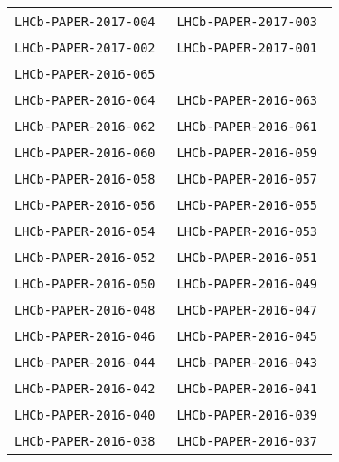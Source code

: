 \begin{center}
\begin{longtable}{ll}
\texttt{LHCb-PAPER-2017-004}~\cite{LHCb-PAPER-2017-004} &
\texttt{LHCb-PAPER-2017-003}~\cite{LHCb-PAPER-2017-003} \\
\texttt{LHCb-PAPER-2017-002}~\cite{LHCb-PAPER-2017-002} &
\texttt{LHCb-PAPER-2017-001}~\cite{LHCb-PAPER-2017-001} \\
\hline
\texttt{LHCb-PAPER-2016-065}~\cite{LHCb-PAPER-2016-065} & 
                                                        \\
\texttt{LHCb-PAPER-2016-064}~\cite{LHCb-PAPER-2016-064} & 
\texttt{LHCb-PAPER-2016-063}~\cite{LHCb-PAPER-2016-063} \\
\texttt{LHCb-PAPER-2016-062}~\cite{LHCb-PAPER-2016-062} & 
\texttt{LHCb-PAPER-2016-061}~\cite{LHCb-PAPER-2016-061} \\
\texttt{LHCb-PAPER-2016-060}~\cite{LHCb-PAPER-2016-060} & 
\texttt{LHCb-PAPER-2016-059}~\cite{LHCb-PAPER-2016-059} \\
\texttt{LHCb-PAPER-2016-058}~\cite{LHCb-PAPER-2016-058} & 
\texttt{LHCb-PAPER-2016-057}~\cite{LHCb-PAPER-2016-057} \\
\texttt{LHCb-PAPER-2016-056}~\cite{LHCb-PAPER-2016-056} & 
\texttt{LHCb-PAPER-2016-055}~\cite{LHCb-PAPER-2016-055} \\
\texttt{LHCb-PAPER-2016-054}~\cite{LHCb-PAPER-2016-054} & 
\texttt{LHCb-PAPER-2016-053}~\cite{LHCb-PAPER-2016-053} \\
\texttt{LHCb-PAPER-2016-052}~\cite{LHCb-PAPER-2016-052} & 
\texttt{LHCb-PAPER-2016-051}~\cite{LHCb-PAPER-2016-051} \\
\texttt{LHCb-PAPER-2016-050}~\cite{LHCb-PAPER-2016-050} & 
\texttt{LHCb-PAPER-2016-049}~\cite{LHCb-PAPER-2016-049} \\
\texttt{LHCb-PAPER-2016-048}~\cite{LHCb-PAPER-2016-048} & 
\texttt{LHCb-PAPER-2016-047}~\cite{LHCb-PAPER-2016-047} \\
\texttt{LHCb-PAPER-2016-046}~\cite{LHCb-PAPER-2016-046} & 
\texttt{LHCb-PAPER-2016-045}~\cite{LHCb-PAPER-2016-045} \\
\texttt{LHCb-PAPER-2016-044}~\cite{LHCb-PAPER-2016-044} & 
\texttt{LHCb-PAPER-2016-043}~\cite{LHCb-PAPER-2016-043} \\
\texttt{LHCb-PAPER-2016-042}~\cite{LHCb-PAPER-2016-042} & 
\texttt{LHCb-PAPER-2016-041}~\cite{LHCb-PAPER-2016-041} \\
\texttt{LHCb-PAPER-2016-040}~\cite{LHCb-PAPER-2016-040} & 
\texttt{LHCb-PAPER-2016-039}~\cite{LHCb-PAPER-2016-039} \\
\texttt{LHCb-PAPER-2016-038}~\cite{LHCb-PAPER-2016-038} & 
\texttt{LHCb-PAPER-2016-037}~\cite{LHCb-PAPER-2016-037} \\

\end{longtable}
\end{center}
